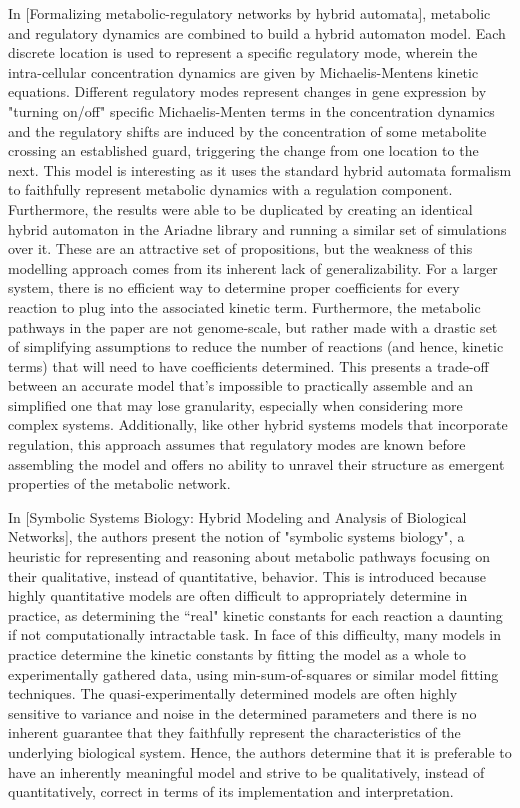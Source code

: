 In [Formalizing metabolic-regulatory networks by hybrid
automata], metabolic and regulatory dynamics are combined to build a hybrid automaton model. Each discrete location is used to represent a specific regulatory mode, wherein the intra-cellular concentration dynamics are given by Michaelis-Mentens kinetic equations. Different regulatory modes represent changes in gene expression by "turning on/off" specific Michaelis-Menten terms in the concentration dynamics and the regulatory shifts are induced by the concentration of some metabolite crossing an established guard, triggering the change from one location to the next. This model is interesting as it uses the standard hybrid automata formalism to faithfully represent metabolic dynamics with a regulation component. Furthermore, the results were able to be duplicated by creating an identical hybrid automaton in the Ariadne library and running a similar set of simulations over it. These are an attractive set of propositions, but the weakness of this modelling approach comes from its inherent lack of generalizability. For a larger system, there is no efficient way to determine proper coefficients for every reaction to plug into the associated kinetic term. Furthermore, the metabolic pathways in the paper are not genome-scale, but rather made with a drastic set of simplifying assumptions to reduce the number of reactions (and hence, kinetic terms) that will need to have coefficients determined. This presents a trade-off between an accurate model that's impossible to practically assemble and an simplified one that may lose granularity, especially when considering more complex systems. Additionally, like other hybrid systems models that incorporate regulation, this approach assumes that regulatory modes are known before assembling the model and offers no ability to unravel their structure as emergent properties of the metabolic network.

In [Symbolic Systems Biology: Hybrid Modeling
and Analysis of Biological Networks], the authors present the notion of "symbolic systems biology", a heuristic for representing and reasoning about metabolic pathways focusing on their qualitative, instead of quantitative, behavior. This is introduced because highly quantitative models are often difficult to appropriately determine in practice, as determining the ``real" kinetic constants for each reaction a daunting if not computationally intractable task. In face of this difficulty, many models in practice determine the kinetic constants by fitting the model as a whole to experimentally gathered data, using min-sum-of-squares or similar model fitting techniques. The quasi-experimentally determined models are often highly sensitive to variance and noise in the determined parameters and there is no inherent guarantee that they faithfully represent the characteristics of the underlying biological system. Hence, the authors determine that it is preferable to have an inherently meaningful model and strive to be qualitatively, instead of quantitatively, correct in terms of its implementation and interpretation. 


